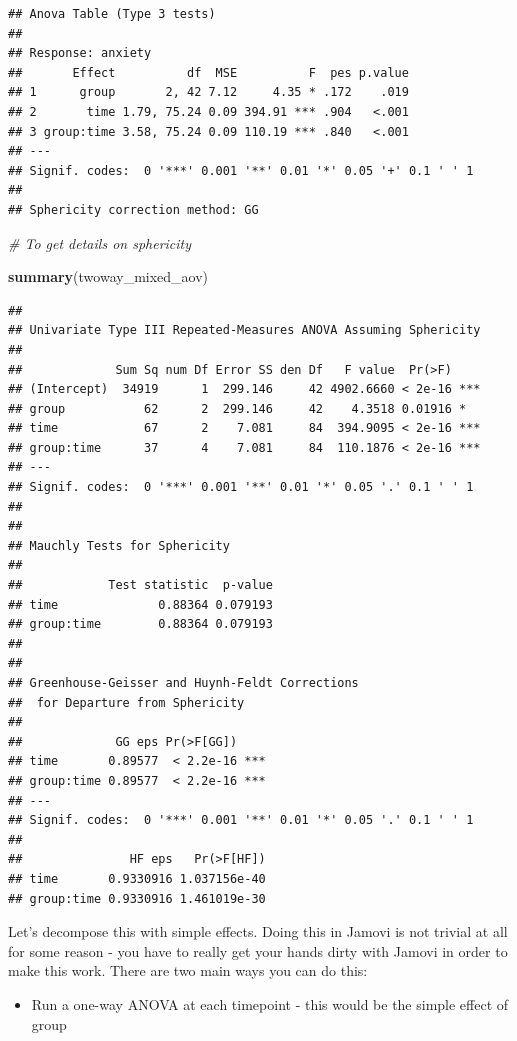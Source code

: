 \documentclass[
]{book}
\newenvironment{Shaded}{\begin{snugshade}}{\end{snugshade}}
\newcommand{\CommentTok}[1]{\textcolor[rgb]{0.56,0.35,0.01}{\textit{#1}}}
\newcommand{\FunctionTok}[1]{\textcolor[rgb]{0.13,0.29,0.53}{\textbf{#1}}}
\newcommand{\NormalTok}[1]{#1}
\providecommand{\tightlist}{%
  \setlength{\itemsep}{0pt}\setlength{\parskip}{0pt}}
\begin{document}
\begin{verbatim}
## Anova Table (Type 3 tests)
## 
## Response: anxiety
##       Effect          df  MSE          F  pes p.value
## 1      group       2, 42 7.12     4.35 * .172    .019
## 2       time 1.79, 75.24 0.09 394.91 *** .904   <.001
## 3 group:time 3.58, 75.24 0.09 110.19 *** .840   <.001
## ---
## Signif. codes:  0 '***' 0.001 '**' 0.01 '*' 0.05 '+' 0.1 ' ' 1
## 
## Sphericity correction method: GG
\end{verbatim}

\begin{Shaded}
\begin{Highlighting}[]
\CommentTok{\# To get details on sphericity}

\FunctionTok{summary}\NormalTok{(twoway\_mixed\_aov)}
\end{Highlighting}
\end{Shaded}

\begin{verbatim}
## 
## Univariate Type III Repeated-Measures ANOVA Assuming Sphericity
## 
##             Sum Sq num Df Error SS den Df   F value  Pr(>F)    
## (Intercept)  34919      1  299.146     42 4902.6660 < 2e-16 ***
## group           62      2  299.146     42    4.3518 0.01916 *  
## time            67      2    7.081     84  394.9095 < 2e-16 ***
## group:time      37      4    7.081     84  110.1876 < 2e-16 ***
## ---
## Signif. codes:  0 '***' 0.001 '**' 0.01 '*' 0.05 '.' 0.1 ' ' 1
## 
## 
## Mauchly Tests for Sphericity
## 
##            Test statistic  p-value
## time              0.88364 0.079193
## group:time        0.88364 0.079193
## 
## 
## Greenhouse-Geisser and Huynh-Feldt Corrections
##  for Departure from Sphericity
## 
##             GG eps Pr(>F[GG])    
## time       0.89577  < 2.2e-16 ***
## group:time 0.89577  < 2.2e-16 ***
## ---
## Signif. codes:  0 '***' 0.001 '**' 0.01 '*' 0.05 '.' 0.1 ' ' 1
## 
##               HF eps   Pr(>F[HF])
## time       0.9330916 1.037156e-40
## group:time 0.9330916 1.461019e-30
\end{verbatim}

Let's decompose this with simple effects. Doing this in Jamovi is not trivial at all for some reason - you have to really get your hands dirty with Jamovi in order to make this work. There are two main ways you can do this:

\begin{itemize}
\tightlist
\item
  Run a one-way ANOVA at each timepoint - this would be the simple effect of group
\end{itemize}
\end{document}
